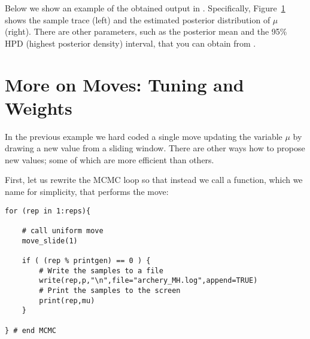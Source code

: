 Below we show an example of the obtained output in \Tracer.
Specifically, Figure~\ref{fig:mcmc_samples} shows the sample trace (left) and the estimated posterior distribution of $\mu$ (right).
There are other parameters, such as the posterior mean and the 95\% HPD (highest posterior density) interval, that you can obtain from \Tracer.
\begin{figure}[h!]
\centering
{}
\label{fig:mcmc_samples}
\end{figure}
\pagebreak


\section{More on Moves: Tuning and Weights}\label{sect:More_on_Moves}

In the previous example we hard coded a single move updating the variable $\mu$ by drawing a new value from a sliding window.
There are other ways how to propose new values; some of which are more efficient than others.

First, let us rewrite the MCMC loop so that instead we call a function, which we name  for simplicity, that performs the move:
{\tt \begin{snugshade*}
\begin{lstlisting}    
for (rep in 1:reps){
    
    # call uniform move
    move_slide(1)
    
    if ( (rep % printgen) == 0 ) {
        # Write the samples to a file
        write(rep,p,"\n",file="archery_MH.log",append=TRUE)
        # Print the samples to the screen
        print(rep,mu)
    }

} # end MCMC
\end{lstlisting}
\end{snugshade*}}

